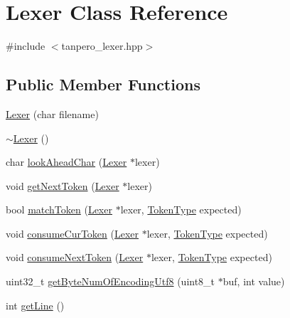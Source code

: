 \hypertarget{class_lexer}{}\section{Lexer Class Reference}
\label{class_lexer}


{\ttfamily \#include $<$tanpero\+\_\+lexer.\+hpp$>$}

\subsection*{Public Member Functions}
\begin{DoxyCompactItemize}
\item 
\mbox{\hyperlink{class_lexer_a90b6530e5beaa58f8109884ebdfe9cf4}{Lexer}} (char filename)
\item 
\mbox{\hyperlink{class_lexer_ad26a84af23d8d303723e36e83fc4e556}{$\sim$\+Lexer}} ()
\item 
char \mbox{\hyperlink{class_lexer_ac67d9874accafc361be7ba6fd03a8381}{look\+Ahead\+Char}} (\mbox{\hyperlink{class_lexer}{Lexer}} $\ast$lexer)
\item 
void \mbox{\hyperlink{class_lexer_afa25aeaf08e405e628712a43809fc1e4}{get\+Next\+Token}} (\mbox{\hyperlink{class_lexer}{Lexer}} $\ast$lexer)
\item 
bool \mbox{\hyperlink{class_lexer_a0e6e248f291aae843df618871563fe46}{match\+Token}} (\mbox{\hyperlink{class_lexer}{Lexer}} $\ast$lexer, \mbox{\hyperlink{tanpero__token_8hpp_aa520fbf142ba1e7e659590c07da31921}{Token\+Type}} expected)
\item 
void \mbox{\hyperlink{class_lexer_acfbc499dc83e3b7100a037e228eeba25}{consume\+Cur\+Token}} (\mbox{\hyperlink{class_lexer}{Lexer}} $\ast$lexer, \mbox{\hyperlink{tanpero__token_8hpp_aa520fbf142ba1e7e659590c07da31921}{Token\+Type}} expected)
\item 
void \mbox{\hyperlink{class_lexer_a1f77f9ba59aa650cdf1bcf3e89ea8d26}{consume\+Next\+Token}} (\mbox{\hyperlink{class_lexer}{Lexer}} $\ast$lexer, \mbox{\hyperlink{tanpero__token_8hpp_aa520fbf142ba1e7e659590c07da31921}{Token\+Type}} expected)
\item 
uint32\+\_\+t \mbox{\hyperlink{class_lexer_abfe67c88132256e11bb2e1b910c369db}{get\+Byte\+Num\+Of\+Encoding\+Utf8}} (uint8\+\_\+t $\ast$buf, int value)
\item 
int \mbox{\hyperlink{class_lexer_a0ede40225695d9eb9b42d275584cf8f0}{get\+Line}} ()
\end{DoxyCompactItemize}
